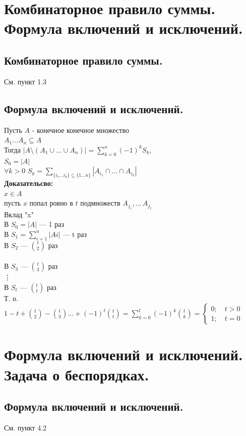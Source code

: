 \documentclass[12pt]{article}
\begin{document}
\section{Комбинаторное правило суммы. Формула включений и исключений.}
\subsection{Комбинаторное правило суммы.}
	См. пункт 1.3
\subsection{Формула включений и исключений.}
	Пусть $A$ - конечное конечное множество\\
	$A_1 \ldots A_n \subseteq A$\\
	Тогда $ \displaystyle |A \setminus (A_1 \cup \ldots \cup A_n)| = \sum_{k=0}^n (-1)^kS_k$,\\
	$S_0 = |A|$\\
	$\forall k > 0$ $S_k = \displaystyle\sum_{\{ i_1 \ldots i_k\} \subseteq \{1\ldots n\}} |A_{i_1} \cap\ldots\cap A_{i_k}| $\\
\textbf{Доказательсво:}\\
	$ x \in A$\\
	пусть $x$ попал ровно в $t$ подмножеств $A_{j_1},\dotsc\,A_{j_t}$\\
	Вклад "x"\\
	В $S_0 = |A|$ — 1 раз\\
	В $S_1 = \displaystyle\sum_{i=1}^{n}|Ai|$ — t раз\\
	В $S_2$ — $\binom{t}{2}$ раз\\\\
	В $S_3$ — $\binom{t}{3}$ раз\\
	\vdots\\
	В $S_t$ — $\binom{t}{t}$ раз\\
	Т. о. $\displaystyle 1 - t + \binom{t}{2} - \binom{t}{3} \ldots + (-1)^t \binom{t}{t} = \sum_{k=0}^{t}(-1)^k \binom{t}{k} =
	\begin{cases}
	0; \quad t > 0\\
	1; \quad t = 0
	\end{cases}$\\
	\qedsymbol

\section{Формула включений и исключений. Задача о беспорядках.}
\subsection{Формула включений и исключений.}
	См. пункт 4.2
\end{document}
